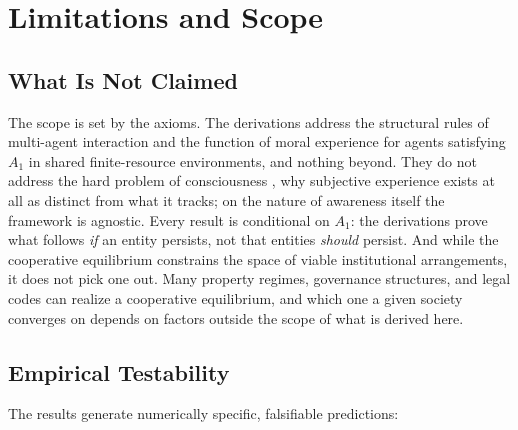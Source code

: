 \documentclass[11pt]{article}
\theoremstyle{plain}
\theoremstyle{definition}
\theoremstyle{remark}
\let\origsection\section
\renewcommand{\section}{\needspace{12\baselineskip}\origsection}
\let\origsubsection\subsection
\renewcommand{\subsection}{\needspace{7\baselineskip}\origsubsection}
\begin{document}
\section{Limitations and Scope}\label{limitations-and-scope}

\subsection{What Is Not Claimed}\label{what-is-not-claimed}

The scope is set by the axioms. The derivations address the structural
rules of multi-agent interaction and the function of moral experience
for agents satisfying \(A_1\) in shared finite-resource environments,
and nothing beyond. They do not address the hard problem of
consciousness \citep{Chalmers1995}, why subjective experience exists at
all as distinct from what it tracks; on the nature of awareness itself
the framework is agnostic. Every result is conditional on \(A_1\): the
derivations prove what follows \emph{if} an entity persists, not that
entities \emph{should} persist. And while the cooperative equilibrium
constrains the space of viable institutional arrangements, it does not
pick one out. Many property regimes, governance structures, and legal
codes can realize a cooperative equilibrium, and which one a given
society converges on depends on factors outside the scope of what is
derived here.

\subsection{Empirical Testability}\label{empirical-testability}

The results generate numerically specific, falsifiable predictions:

\small
\end{document}
